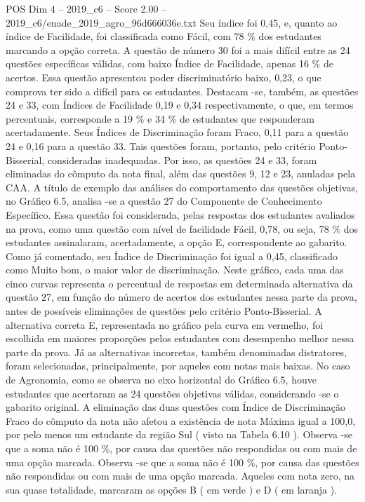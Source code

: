 \begin{textsample}{POS Dim 4 – 2019\_c6 – Score 2.00 – 2019\_c6/enade\_2019\_agro\_96d666036e.txt}
Seu índice foi 0,45, e, quanto ao índice de Facilidade, foi classificada como Fácil, com 78 \% dos estudantes marcando a opção correta.
A questão de número 30 foi a mais difícil entre as 24 questões específicas válidas, com baixo Índice de Facilidade, apenas 16 \% de acertos.
Essa questão apresentou poder discriminatório baixo, 0,23, o que comprova ter sido a difícil para os estudantes.
Destacam -se, também, as questões 24 e 33, com Índices de Facilidade 0,19 e 0,34 respectivamente, o que, em termos percentuais, corresponde a 19 \% e 34 \% de estudantes que responderam acertadamente.
Seus Índices de Discriminação foram Fraco, 0,11 para a questão 24 e 0,16 para a questão 33.
Tais questões foram, portanto, pelo critério Ponto-Bisserial, consideradas inadequadas.
Por isso, as questões 24 e 33, foram eliminadas do cômputo da nota final, além das questões 9, 12 e 23, anuladas pela CAA.
A título de exemplo das análises do comportamento das questões objetivas, no Gráfico 6.5, analisa -se a questão 27 do Componente de Conhecimento Específico.
Essa questão foi considerada, pelas respostas dos estudantes avaliados na prova, como uma questão com nível de facilidade Fácil, 0,78, ou seja, 78 \% dos estudantes assinalaram, acertadamente, a opção E, correspondente ao gabarito.
Como já comentado, seu Índice de Discriminação foi igual a 0,45, classificado como Muito bom, o maior valor de discriminação.
Neste gráfico, cada uma das cinco curvas representa o percentual de respostas em determinada alternativa da questão 27, em função do número de acertos dos estudantes nessa parte da prova, antes de possíveis eliminações de questões pelo critério Ponto-Bisserial.
A alternativa correta E, representada no gráfico pela curva em vermelho, foi escolhida em maiores proporções pelos estudantes com desempenho melhor nessa parte da prova.
Já as alternativas incorretas, também denominadas distratores, foram selecionadas, principalmente, por aqueles com notas mais baixas.
No caso de Agronomia, como se observa no eixo horizontal do Gráfico 6.5, houve estudantes que acertaram as 24 questões objetivas válidas, considerando -se o gabarito original.
A eliminação das duas questões com Índice de Discriminação Fraco do cômputo da nota não afetou a existência de nota Máxima igual a 100,0, por pelo menos um estudante da região Sul ( visto na Tabela 6.10 ).
Observa -se que a soma não é 100 \%, por causa das questões não respondidas ou com mais de uma opção marcada.
Observa -se que a soma não é 100 \%, por causa das questões não respondidas ou com mais de uma opção marcada.
Aqueles com nota zero, na sua quase totalidade, marcaram as opções B ( em verde ) e D ( em laranja ).

\end{textsample}
